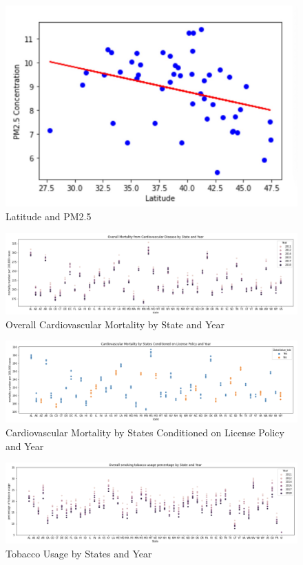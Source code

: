 \documentclass{article}
\begin{document}
\begin{figure}[h]
\centering
\caption{\label{fig:figure26}Latitude and PM2.5}
\includegraphics[width=1.0\textwidth]{Latitude and PM2.5.png}
\end{figure}

\begin{figure}[h]
\centering
\caption{\label{fig:figure1} Overall Cardiovascular Mortality by State and Year}
\includegraphics[width=1.0\textwidth]{mortality_cardi_graph1.png}
\end{figure}

\begin{figure}[h]
\centering
\caption{\label{fig:figure2}Cardiovascular Mortality by States Conditioned on License Policy and Year}
\includegraphics[width=1.0\textwidth]{mortality_toba_graph1.png}
\end{figure}

\begin{figure}[h]
\centering
\caption{\label{fig:figure3}Tobacco Usage by States and Year}
\includegraphics[width=1.0\textwidth]{toba_graph2.png}
\end{figure}
\end{document}
